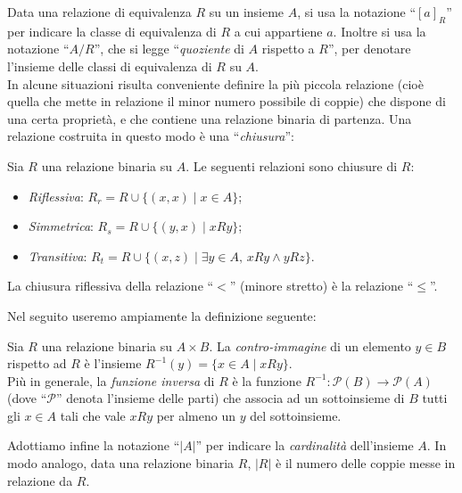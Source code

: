 Data una relazione di equivalenza $R$ su un insieme $A$, si usa la notazione ``$[a]_R$'' per indicare la classe di equivalenza di $R$ a cui appartiene $a$. Inoltre si usa la notazione ``$A/R$'', che si legge ``\emph{quoziente} di $A$ rispetto a $R$'', per denotare l'insieme delle classi di equivalenza di $R$ su $A$.\\
In alcune situazioni risulta conveniente definire la più piccola relazione (cioè quella che mette in relazione il minor numero possibile di coppie) che dispone di una certa proprietà, e che contiene una relazione binaria di partenza. Una relazione costruita in questo modo è una ``\emph{chiusura}'':
\begin{definition}
	Sia $R$ una relazione binaria su $A$. Le seguenti relazioni sono chiusure di $R$:
    \begin{itemize}
        \item \emph{Riflessiva}: $R_r = R \cup \{(x,x) \mid x \in A\}$;
        \item \emph{Simmetrica}: $R_s = R \cup \{(y,x) \mid x R y\}$;
        \item \emph{Transitiva}: $R_t = R \cup \{(x,z) \mid \exists y \in A,\, x R y \land y R z\}$.
    \end{itemize}
\end{definition}
\begin{example}
    La chiusura riflessiva della relazione ``$<$'' (minore stretto) è la relazione ``$\leq$''.
\end{example}
Nel seguito useremo ampiamente la definizione seguente:
\begin{definition}
    Sia $R$ una relazione binaria su $A \times B$. La \emph{contro-immagine} di un elemento $y \in B$ rispetto ad $R$ è l'insieme $R^{-1}(y) = \{x \in A \mid x R y\}$.\\
    Più in generale, la \emph{funzione inversa} di $R$ è la funzione $R^{-1} : \mathcal{P}(B) \to \mathcal{P}(A)$ (dove ``$\mathcal{P}$'' denota l'insieme delle parti) che associa ad un sottoinsieme di $B$ tutti gli $x \in A$ tali che vale $x R y$ per almeno un $y$ del sottoinsieme.
\end{definition}
Adottiamo infine la notazione ``$|A|$'' per indicare la \emph{cardinalità} dell'insieme $A$. In modo analogo, data una relazione binaria $R$, $|R|$ è il numero delle coppie messe in relazione da $R$.

